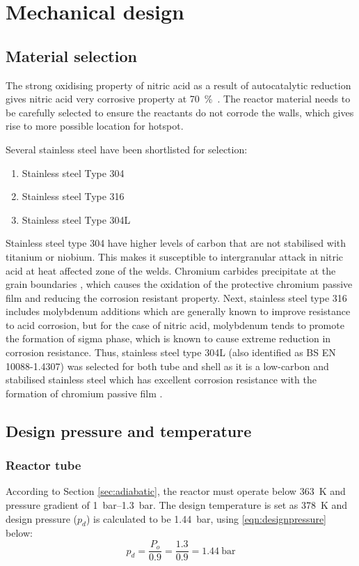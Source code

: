 \section{Mechanical design}
\subsection{Material selection}
The strong oxidising property of nitric acid as a result of autocatalytic reduction \cite{suresh_corrosion_nodate} gives nitric acid very corrosive property at \SI{70}{\percent\wv}. The reactor material needs to be carefully selected to ensure the reactants do not corrode the walls, which gives rise to more possible location for hotspot.

Several stainless steel have been shortlisted for selection: 
\begin{enumerate}
    \item Stainless steel Type 304
    \item Stainless steel Type 316
    \item Stainless steel Type 304L
\end{enumerate}

Stainless steel type 304 have higher levels of carbon that are not stabilised with titanium or niobium. This makes it susceptible to intergranular attack in nitric acid at heat affected zone of the welds. Chromium carbides precipitate at the grain boundaries \cite{cm_selection_nodate}, which causes the oxidation of the protective chromium passive film and reducing the corrosion resistant property. Next, stainless steel type 316 includes molybdenum additions which are generally known to improve resistance to acid corrosion, but for the case of nitric acid, molybdenum tends to promote the formation of sigma phase, which is known to cause extreme reduction in corrosion resistance. Thus, stainless steel type 304L (also identified as BS EN 10088-1.4307) was selected for both tube and shell as it is a low-carbon and stabilised stainless steel which has excellent corrosion resistance with the formation of chromium passive film \cite{ningshen_corrosion_2011}.

\subsection{Design pressure and temperature}
\subsubsection{Reactor tube}
According to Section \ref{sec:adiabatic}, the reactor must operate below \SI{363}{\K} and pressure gradient of \SIrange{1}{1.3}{\bar}. The design temperature is set as \SI{378}{\K} and design pressure ($p_d$) is calculated to be \SI{1.44}{\bar}, using \cref{eqn:designpressure} below:
\begin{equation}
    p_d = \frac{P_o}{0.9} = \frac{1.3}{0.9} = \SI{1.44}{\bar}
    \label{eqn:designpressure}
\end{equation}

